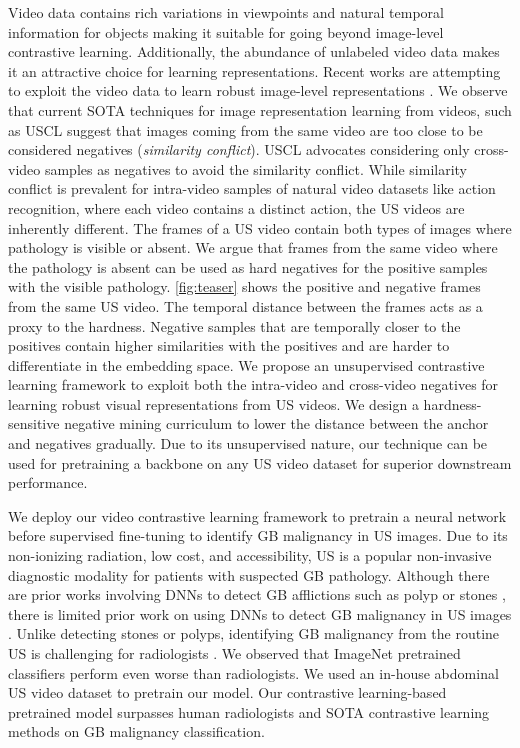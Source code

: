 \documentclass[runningheads]{llncs}
\begin{document}
Video data contains rich variations in viewpoints and natural temporal information for objects making it suitable for going beyond image-level contrastive learning. Additionally, the abundance of unlabeled video data makes it an attractive choice for learning representations. Recent works are attempting to exploit the video data to learn robust image-level representations \cite{uscl,cyclecontrast}. We observe that current SOTA techniques for image representation learning from videos, such as USCL \cite{uscl} suggest that images coming from the same video are too close to be considered negatives (\emph{similarity conflict}). USCL advocates considering only cross-video samples as negatives to avoid the similarity conflict. While similarity conflict is prevalent for intra-video samples of natural video datasets like action recognition, where each video contains a distinct action, the US videos are inherently different. The frames of a US video contain both types of images where pathology is visible or absent. We argue that frames from the same video where the pathology is absent can be used as hard negatives for the positive samples with the visible pathology. \cref{fig:teaser} shows the positive and negative frames from the same US video. The temporal distance between the frames acts as a proxy to the hardness. Negative samples that are temporally closer to the positives contain higher similarities with the positives and are harder to differentiate in the embedding space. We propose an unsupervised contrastive learning framework to exploit both the intra-video and cross-video negatives for learning robust visual representations from US videos. We design a hardness-sensitive negative mining curriculum to lower the distance between the anchor and negatives gradually. Due to its unsupervised nature, our technique can be used for pretraining a backbone on any US video dataset for superior downstream performance.

We deploy our video contrastive learning framework to pretrain a neural network before supervised fine-tuning to identify GB malignancy in US images. Due to its non-ionizing radiation, low cost, and accessibility, US is a popular non-invasive diagnostic modality for patients with suspected GB pathology. Although there are prior works involving DNNs to detect GB afflictions such as polyp or stones \cite{gbPolyp,gbPolyp2,gbAutomatic}, there is limited prior work on using DNNs to detect GB malignancy in US images \cite{basu2022surpassing}. Unlike detecting stones or polyps, identifying GB malignancy from the routine US is challenging for radiologists \cite{gb-rads-paper,gupta2020imaging}. We observed that ImageNet pretrained classifiers perform even worse than radiologists. We used an in-house abdominal US video dataset to pretrain our model. Our contrastive learning-based pretrained model surpasses human radiologists and SOTA contrastive learning methods on GB malignancy classification.
\end{document}
